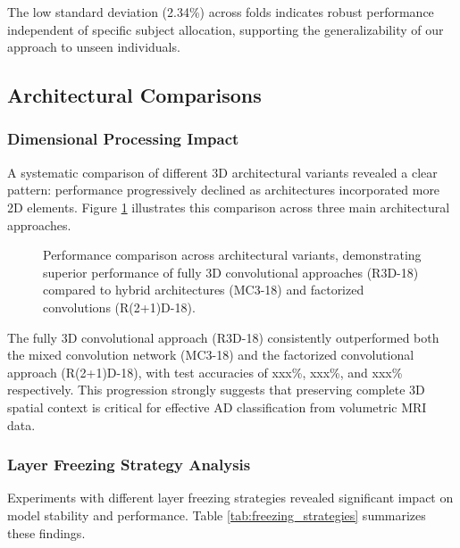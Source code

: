 \documentclass[12pt, a4paper]{article}
\begin{document}
The low standard deviation (2.34\%) across folds indicates robust performance independent of specific subject allocation, supporting the generalizability of our approach to unseen individuals.

\subsection{Architectural Comparisons}

\subsubsection{Dimensional Processing Impact}

A systematic comparison of different 3D architectural variants revealed a clear pattern: performance progressively declined as architectures incorporated more 2D elements. Figure \ref{fig:architecture_comparison} illustrates this comparison across three main architectural approaches.
\begin{figure}[htbp]
  \centering
  \caption{Performance comparison across architectural variants, demonstrating superior performance of fully 3D convolutional approaches (R3D-18) compared to hybrid architectures (MC3-18) and factorized convolutions (R(2+1)D-18).}
  \label{fig:architecture_comparison}
\end{figure}

The fully 3D convolutional approach (R3D-18) consistently outperformed both the mixed convolution network (MC3-18) and the factorized convolutional approach (R(2+1)D-18), with test accuracies of xxx\%, xxx\%, and xxx\% respectively. This progression strongly suggests that preserving complete 3D spatial context is critical for effective AD classification from volumetric MRI data.


\subsubsection{Layer Freezing Strategy Analysis}

Experiments with different layer freezing strategies revealed significant impact on model stability and performance. Table \ref{tab:freezing_strategies} summarizes these findings.
\end{document}
